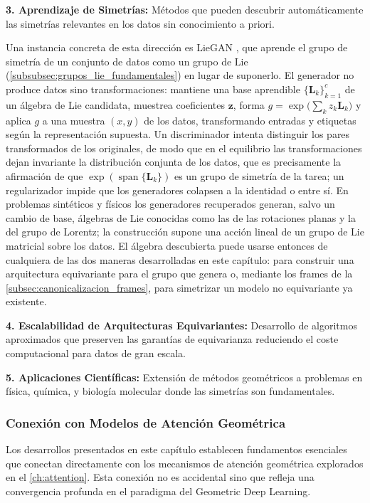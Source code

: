 \textbf{3. Aprendizaje de Simetrías:} Métodos que pueden descubrir automáticamente las simetrías relevantes en los datos sin conocimiento a priori.

Una instancia concreta de esta dirección es LieGAN \citep{yang2023liegan}, que aprende el grupo de simetría de un conjunto de datos como un grupo de Lie (\autoref{subsubsec:grupos_lie_fundamentales}) en lugar de suponerlo. El generador no produce datos sino transformaciones: mantiene una base aprendible $\{\mathbf{L}_k\}_{k=1}^{c}$ de un álgebra de Lie candidata, muestrea coeficientes $\mathbf{z}$, forma $g = \exp\big(\sum_k z_k \mathbf{L}_k\big)$ y aplica $g$ a una muestra $(x, y)$ de los datos, transformando entradas y etiquetas según la representación supuesta. Un discriminador intenta distinguir los pares transformados de los originales, de modo que en el equilibrio las transformaciones dejan invariante la distribución conjunta de los datos, que es precisamente la afirmación de que $\exp(\operatorname{span}\{\mathbf{L}_k\})$ es un grupo de simetría de la tarea; un regularizador impide que los generadores colapsen a la identidad o entre sí. En problemas sintéticos y físicos los generadores recuperados generan, salvo un cambio de base, álgebras de Lie conocidas como las de las rotaciones planas y la del grupo de Lorentz; la construcción supone una acción lineal de un grupo de Lie matricial sobre los datos. El álgebra descubierta puede usarse entonces de cualquiera de las dos maneras desarrolladas en este capítulo: para construir una arquitectura equivariante para el grupo que genera o, mediante los frames de la \autoref{subsec:canonicalizacion_frames}, para simetrizar un modelo no equivariante ya existente.

\textbf{4. Escalabilidad de Arquitecturas Equivariantes:} Desarrollo de algoritmos aproximados que preserven las garantías de equivarianza reduciendo el coste computacional para datos de gran escala.

\textbf{5. Aplicaciones Científicas:} Extensión de métodos geométricos a problemas en física, química, y biología molecular donde las simetrías son fundamentales.

\subsubsection{Conexión con Modelos de Atención Geométrica}

Los desarrollos presentados en este capítulo establecen fundamentos esenciales que conectan directamente con los mecanismos de atención geométrica explorados en el \autoref{ch:attention}. Esta conexión no es accidental sino que refleja una convergencia profunda en el paradigma del Geometric Deep Learning.

